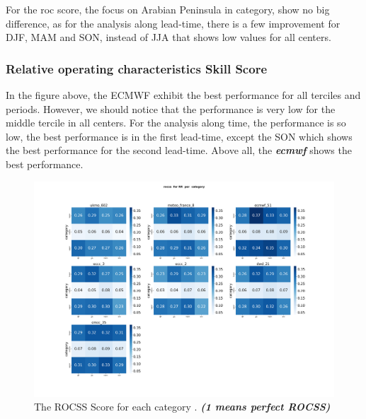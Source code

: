 For the roc score, the focus on Arabian Peninsula in category, show no big difference, as for the analysis along lead-time, there is a few improvement for DJF, MAM and SON, instead of JJA that shows low values for all centers. 																								
\subsubsection{Relative operating characteristics Skill Score}

In the figure above, the ECMWF exhibit the best performance for all terciles and periods. However, we should notice that the performance is very low for the middle tercile in all centers. For the analysis along time, the performance is so low, the best performance is in the first lead-time, except the SON which shows the best performance for the second lead-time. Above all, the \textbf{\textit{ecmwf}} shows the best performance.

\begin{figure}[H]
    \centering
    \includegraphics[scale=0.25]{plots/prob/rocss/rocss_RR_category.png}
    \caption{The ROCSS Score for each category  . \textbf{\textit{(1 means perfect ROCSS)}}}
\end{figure}


